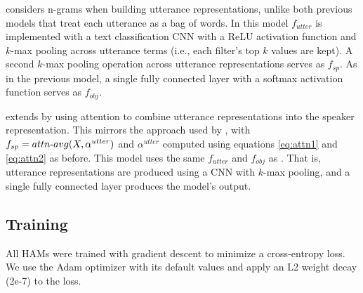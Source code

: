  considers n-grams when building utterance representations, unlike both previous models that treat each utterance as a bag of words. In this model $f_{utter}$ is implemented with a text classification CNN \cite{cnn} with a ReLU activation function and $k$-max pooling across utterance terms (i.e., each filter's top $k$ values are kept).
A second $k$-max pooling operation across utterance representations serves as $f_{sp}$.
As in the previous model, a single fully connected layer with a softmax activation function serves as $f_{obj}$.

 extends  by using attention to combine utterance representations into the speaker representation.
This mirrors the approach used by , with $f_{sp}=attn{\text -}avg(X, \alpha^{utter})$ and $\alpha^{utter}$ computed using equations \ref{eq:attn1} and \ref{eq:attn2} as before.
This model uses the same $f_{utter}$ and $f_{obj}$ as . That is, utterance representations are produced using a CNN with $k$-max pooling, and a single fully connected layer produces the model's output.

\subsection{Training}
All 
HAMs
were trained with gradient descent to minimize a cross-entropy loss. 
We use the Adam optimizer \cite{adam} with its default values and apply an L2 weight decay (2e-7) to the loss.